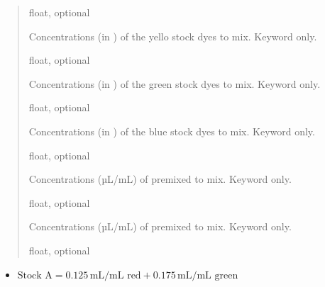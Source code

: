 \documentclass[letterpaper,10pt,english]{sphinxmanual}
\begin{document}
\begin{fulllineitems}
\begin{quote}
\begin{description}
\sphinxAtStartPar
float, optional

\sphinxAtStartPar
{}

\sphinxAtStartPar
Concentrations (in ) of the yello stock dyes to mix. Keyword only.

\sphinxAtStartPar
float, optional

\sphinxAtStartPar
{}

\sphinxAtStartPar
Concentrations (in ) of the green stock dyes to mix. Keyword only.

\sphinxAtStartPar
float, optional

\sphinxAtStartPar
{}

\sphinxAtStartPar
Concentrations (in ) of the blue stock dyes to mix. Keyword only.

\sphinxAtStartPar
float, optional

\sphinxAtStartPar
{}

\sphinxAtStartPar
Concentrations (µL/mL) of premixed  to mix. Keyword only.

\sphinxAtStartPar
float, optional

\sphinxAtStartPar
{}

\sphinxAtStartPar
Concentrations (µL/mL) of premixed  to mix. Keyword only.

\sphinxAtStartPar
float, optional

\end{description}\end{quote}
\begin{itemize}
\item {} 
\sphinxAtStartPar
\(\text{Stock A}=0.125\,\text{mL/mL red}
+ 0.175\,\text{mL/mL green}\)


\end{itemize}
\end{fulllineitems}
\end{document}
